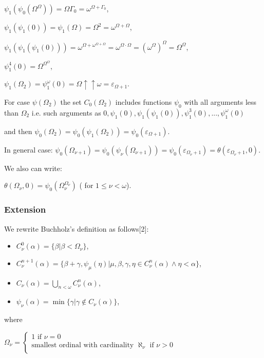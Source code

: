 \documentclass[10pt]{article}
\begin{document}
\(\psi_1(\psi_0(\Omega^\Omega))=\Omega\Gamma_0=\omega^{\Omega+\Gamma_0}\),

\(\psi_1(\psi_1(0))=\psi_1(\Omega)=\Omega^2=\omega^{\Omega+\Omega}\),

\(\psi_1(\psi_1(\psi_1(0)))=\omega^{\Omega+\omega^{\Omega+\Omega}}=\omega^{\Omega\cdot\Omega}=(\omega^{\Omega})^\Omega=\Omega^\Omega\),

\(\psi_1^4(0)=\Omega^{\Omega^\Omega}\),

\(\psi_1(\Omega_2)=\psi_1^\omega(0)=\Omega\uparrow\uparrow\omega=\varepsilon_{\Omega+1}\).

For case \(\psi(\Omega_2)\) the set \(C_0(\Omega_2)\) includes functions \(\psi_0\) with all arguments less than \(\Omega_2\) i.e. such arguments as \(0, \psi_1(0), \psi_1(\psi_1(0)), \psi_1^3(0),..., \psi_1^\omega(0)\)

and then \(\psi_0(\Omega_2)=\psi_0(\psi_1(\Omega_2))=\psi_0(\varepsilon_{\Omega+1})\).

In general case: \(\psi_0(\Omega_{\nu+1})=\psi_0(\psi_\nu(\Omega_{\nu+1}))=\psi_0(\varepsilon_{\Omega_\nu+1})=\theta(\varepsilon_{\Omega_\nu+1},0)\).

We also can write:

\(\theta(\Omega_\nu,0)=\psi_0(\Omega_\nu^{\Omega_\nu})\) ( for \( 1\le\nu<\omega\)).

\subsubsection{Extension}

We rewrite Buchholz's definition as follows[2]:

\begin{itemize}
     \setlength{\itemsep}{1pt}
     \setlength{\parskip}{0pt}
     \setlength{\parsep}{0pt}
\item \(C_\nu^0(\alpha) = \{\beta|\beta<\Omega_\nu\}\),
\item \(C_\nu^{n+1}(\alpha) = \{\beta+\gamma,\psi_\mu(\eta)|\mu,\beta, \gamma,\eta\in C_{\nu}^n(\alpha)\wedge\eta<\alpha\}\),
\item \(C_\nu(\alpha) = \bigcup_{n < \omega} C_\nu^n (\alpha)\),
\item \(\psi_\nu(\alpha) = \min\{\gamma | \gamma \not\in C_\nu(\alpha)\}\),
\end{itemize}

where

\(\Omega_\nu=\left\{\begin{array}{lcr} 1\text{ if }\nu=0\\ \text{smallest ordinal with cardinality }\aleph_\nu \text{ if }\nu>0\\ \end{array}\right.\)
\end{document}
